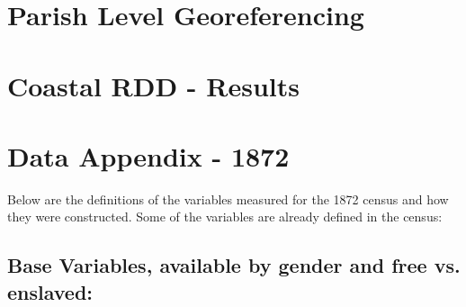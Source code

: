 \documentclass{article}
\begin{document}
\clearpage

\section{Parish Level Georeferencing}
\label{app:georeferencing_parishes}
\clearpage

\section{Coastal RDD - Results}
\label{app:coastal_rdd}
\clearpage

\section{Data Appendix - 1872}
\label{app:variable_construction_1872}

Below are the definitions of the variables measured for the 1872 census and how they were constructed. Some of the variables are already defined in the census:

\subsection{Base Variables, available by gender and free vs. enslaved:}
\end{document}
